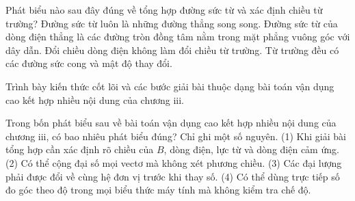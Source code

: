 \begin{ex}
Phát biểu nào sau đây đúng về tổng hợp đường sức từ và xác định chiều từ trường?
\choice
{Đường sức từ luôn là những đường thẳng song song.}
{\True Đường sức từ của dòng điện thẳng là các đường tròn đồng tâm nằm trong mặt phẳng vuông góc với dây dẫn.}
{Đổi chiều dòng điện không làm đổi chiều từ trường.}
{Từ trường đều có các đường sức cong và mật độ thay đổi.}
\end{ex}

\begin{bt}
Trình bày kiến thức cốt lõi và các bước giải bài thuộc dạng bài toán vận dụng cao kết hợp nhiều nội dung của chương iii.
\end{bt}

\begin{ex}
Trong bốn phát biểu sau về bài toán vận dụng cao kết hợp nhiều nội dung của chương iii, có bao nhiêu phát biểu đúng? Chỉ ghi một số nguyên. (1) Khi giải bài tổng hợp cần xác định rõ chiều của $B$, dòng điện, lực từ và dòng điện cảm ứng. (2) Có thể cộng đại số mọi vectơ mà không xét phương chiều. (3) Các đại lượng phải được đổi về cùng hệ đơn vị trước khi thay số. (4) Có thể dùng trực tiếp số đo góc theo độ trong mọi biểu thức máy tính mà không kiểm tra chế độ.
\end{ex}

